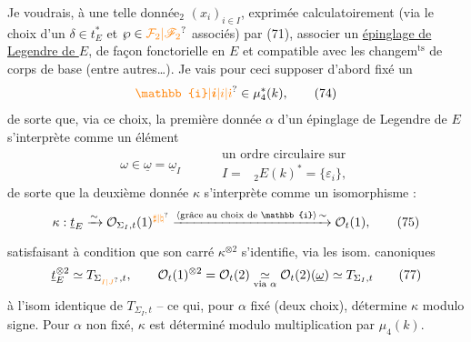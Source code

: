 Je voudrais, à une telle donnée$_2$ $(x_i)_{i\in I}$, exprimée calculatoirement (via le choix d'un $\delta\in t_E^*$ et $\wp\in\unsure{\mathcal F_2|\mathscr F_2}$ associés) par (71), associer  un \uline{épinglage de Legendre de $E$}, de façon fonctorielle en $E$ et compatible avec les changem$^{\mathrm{ts}}$ de corps de base (entre autres\ldots). Je vais pour ceci supposer d'abord fixé un
\[
 \unsure{\mathbb{i}|\boldsymbol{i}|i|\dot{\imath}}\in\mu_4^*(k), \tag*{(74)}
\]
de sorte que, via ce choix, la première donnée $\alpha$ d'un épinglage de Legendre de $E$ s'interprète comme un élément
\[
 \omega\in\underline{\omega}=\underline{\omega}_I\qquad
 \begin{aligned}&\text{un ordre circulaire sur}\\ &I=\phantom{E}_2E(k)^*=\{\varepsilon_i\},\end{aligned}
 \tag*{(75)}
\]
de sorte que la deuxième donnée $\kappa$ s'interprète comme un isomorphisme :
\[
 \kappa:\underline{t}_E\xrightarrow{\sim}\mathcal O_{\Sigma_I,t}(1)^{\unsure{\sharp|\natural}}
 \xrightarrow[\ ]{\inserted{\text{grâce au choix de }\mathbb{i}}\,\sim}\mathcal O_t(1),\tag*{(75)}
\]
satisfaisant à  condition que son carré $\kappa^{\otimes2}$ s'identifie, via les isom. canoniques
\[
 \underline{t}_E^{\otimes2}\simeq T_{\Sigma_{\unsure{I|J}},t},\qquad
 \mathcal O_t(1)^{\otimes2}=\mathcal O_t(2)\underset{\text{via }\alpha}{\simeq}
 \mathcal O_t(2)(\underline\omega)\simeq T_{\Sigma_I,t} \tag*{(77)}
\]
à l'isom identique de $T_{\Sigma_I,t}$ -- ce qui, pour $\alpha$ fixé (deux choix), détermine $\kappa$ modulo signe. Pour $\alpha$ non fixé, $\kappa$ est déterminé modulo multiplication par $\mu_4(k)$.

